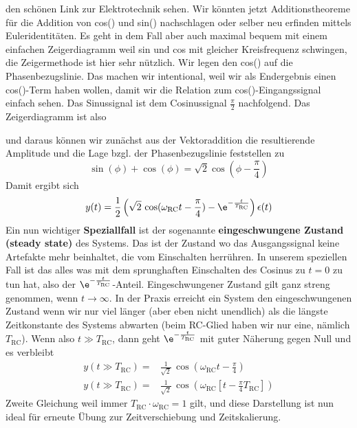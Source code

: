 \begin{Loesung}
\begin{itemize}
den schönen Link zur Elektrotechnik sehen.
%
Wir könnten jetzt Additionstheoreme für die Addition von cos() und sin() nachschlagen
oder selber neu erfinden mittels Euleridentitäten.
%
Es geht in dem Fall aber auch maximal bequem mit einem einfachen Zeigerdiagramm
weil sin und cos mit gleicher Kreisfrequenz schwingen, die Zeigermethode ist hier
sehr nützlich. Wir legen den cos() auf die Phasenbezugslinie.
Das machen wir intentional, weil wir als Endergebnis
einen cos()-Term haben wollen, damit wir die Relation zum cos()-Eingangssignal
einfach sehen. Das Sinussignal ist dem Cosinussignal $\frac{\pi}{2}$ nachfolgend.
Das Zeigerdiagramm ist also
\begin{center}
\end{center}
und daraus können wir zunächst aus der Vektoraddition die resultierende Amplitude und
die Lage bzgl. der Phasenbezugslinie feststellen zu
\begin{equation}
  \sin(\phi) + \cos(\phi) = \sqrt{2} \cos(\phi-\frac{\pi}{4})
\end{equation}
Damit ergibt sich
\begin{align}
  y(t) = \frac{1}{2}\left(
  \sqrt{2}\,\cos(\omega_\mathrm{RC} t - \frac{\pi}{4}) - \e^{-\frac{t}{T_\mathrm{RC}}}
  \right) \epsilon(t)
\end{align}
Ein nun wichtiger \textbf{Speziallfall} ist der sogenannte \textbf{eingeschwungene
Zustand (steady state)} des Systems.
%
Das ist der Zustand wo das Ausgangssignal keine Artefakte mehr beinhaltet, die
vom Einschalten herrühren.
In unserem speziellen Fall ist das alles was mit dem sprunghaften Einschalten
des Cosinus zu $t=0$ zu tun hat, also der
$\e^{-\frac{t}{T_\mathrm{RC}}}$-Anteil.
%
Eingeschwungener Zustand gilt ganz streng genommen, wenn $t\to\infty$.
In der Praxis erreicht ein System den eingeschwungenen Zustand wenn wir nur viel
länger (aber eben nicht unendlich) als die längste Zeitkonstante des Systems
abwarten (beim RC-Glied haben wir nur eine, nämlich $T_\mathrm{RC}$).
%
Wenn also $t \gg T_\mathrm{RC}$,
dann geht $\e^{-\frac{t}{T_\mathrm{RC}}}$ mit guter Näherung gegen Null
und es verbleibt
\begin{align}
  y(t \gg T_\mathrm{RC}) =& \frac{1}{\sqrt{2}} \,\cos(\omega_\mathrm{RC} t - \frac{\pi}{4})\\
  y(t \gg T_\mathrm{RC}) =& \frac{1}{\sqrt{2}} \,\cos(\omega_\mathrm{RC} \left[t - \frac{\pi}{4} T_\mathrm{RC}\right])
\end{align}
Zweite Gleichung weil immer $T_\mathrm{RC}\cdot \omega_\mathrm{RC} =1$ gilt, und diese Darstellung ist nun ideal für erneute Übung
zur Zeitverschiebung und Zeitskalierung.


\end{itemize}
\end{Loesung}
